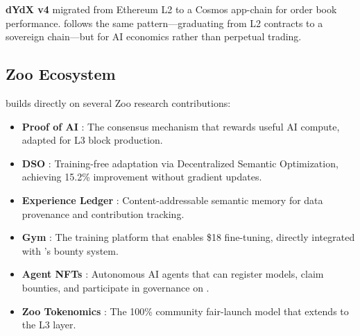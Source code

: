\textbf{dYdX v4} \cite{dydx2023} migrated from Ethereum L2 to a Cosmos app-chain for order book performance. \Beluga{} follows the same pattern---graduating from L2 contracts to a sovereign chain---but for AI economics rather than perpetual trading.

\subsection{Zoo Ecosystem}

\Beluga{} builds directly on several Zoo research contributions:

\begin{itemize}[nosep]
    \item \textbf{Proof of AI} \cite{zoo-poai}: The consensus mechanism that rewards useful AI compute, adapted for L3 block production.
    \item \textbf{DSO} \cite{zoo-dso}: Training-free adaptation via Decentralized Semantic Optimization, achieving 15.2\% improvement without gradient updates.
    \item \textbf{Experience Ledger} \cite{zoo-experience-ledger}: Content-addressable semantic memory for data provenance and contribution tracking.
    \item \textbf{Gym} \cite{zoo-gym}: The training platform that enables \$18 fine-tuning, directly integrated with \Beluga{}'s bounty system.
    \item \textbf{Agent NFTs} \cite{zoo-agent-nft}: Autonomous AI agents that can register models, claim bounties, and participate in governance on \Beluga{}.
    \item \textbf{Zoo Tokenomics} \cite{zoo-tokenomics}: The 100\% community fair-launch model that \Beluga{} extends to the L3 layer.
\end{itemize}

